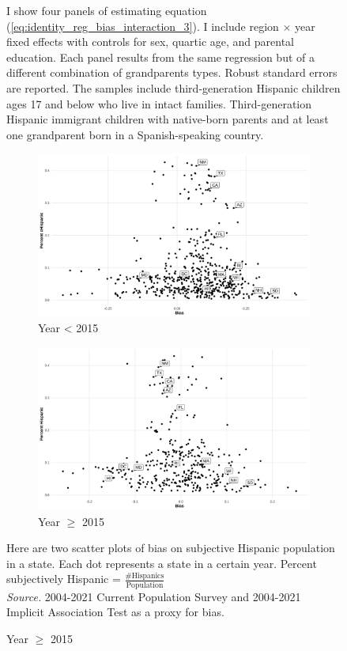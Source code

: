 \documentclass[12pt, fullpage]{article}
\newcommand{\note}[1]{\flushleft\footnotesize{#1}}
\begin{document}
\begin{figure}[H]
\flushleft\footnotesize{\note{I show four panels of estimating equation (\ref{eq:identity_reg_bias_interaction_3}). I include region $\times$ year fixed effects with controls for sex, quartic age, and parental education. Each panel results from the same regression but of a different combination of grandparents types. Robust standard errors are reported. The samples include third-generation Hispanic children ages 17 and below who live in intact families. Third-generation Hispanic immigrant children with native-born parents and at least one grandparent born in a Spanish-speaking country.}}
\end{figure}

\pagebreak
\newpage


\begin{figure}[H]
\centering
\caption{Scatter Plot of Proportion Subjectively Hispanic on Bias}
\label{scatter-plot-1}
\begin{subfigure}{.9\textwidth}
\caption{Year < 2015}
\centering
\includegraphics[width=.9\linewidth]{figure/scatter-plot-bias-hispanic-less2015.png}
\end{subfigure}
\centering
\begin{subfigure}{.9\textwidth}
\caption{Year $\geq$ 2015}
\centering
\includegraphics[width=.9\linewidth]{figure/scatter-plot-bias-hispanic-great2015.png}
\end{subfigure}
\flushleft\footnotesize{\note{Here are two scatter plots of bias on subjective Hispanic population in a state. Each dot represents a state in a certain year. Percent subjectively Hispanic = $\frac{\# \text{Hispanics}}{\text{Population}}$ \\
\emph{Source.} 2004-2021 Current Population Survey and 2004-2021 Implicit Association Test as a proxy for bias.}}
\end{figure}
\end{document}
